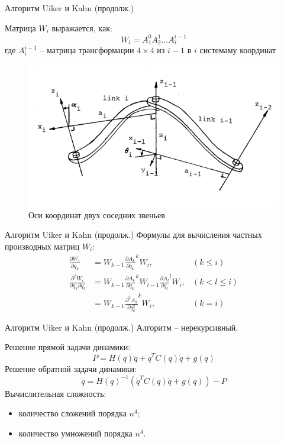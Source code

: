 \documentclass[newPxFont,numfooter,sectionpages]{beamer}
\begin{document}
\begin{frame}{Алгоритм Uiker и Kahn (продолж.)}
	
	Матрица $W_i$ выражается, как:
	\begin{equation*}
	W_i = A_1^0 A_2^1 ... A_i^{i-1}
	\end{equation*}
	где $A_i^{i-1}$ -- матрица трансформации $4 \times 4$ из $i-1$ в $i$ системаму координат
	
	\begin{figure}[H]
		\center\includegraphics[width=0.7\linewidth]{1.png}
		\caption{Оси координат двух соседних звеньев}
		\label{fig:scr1}
	\end{figure}
\end{frame}

\begin{frame}{Алгоритм Uiker и Kahn (продолж.)}
	Формулы для вычисления частных производных матриц $W_i$:
	\begin{align*}
	\frac{\partial W_i}{\partial q_k} &= W_{k-1} \frac{\partial A_k}{\partial q_k} ^k W_i, &(k \le i)\\
	\frac{\partial^2 W_i}{\partial q_k \partial q_l} 
	&= W_{k-1} \frac{\partial A_k}{\partial q_k} ^k W_{l-1}\frac{\partial A_l}{\partial q_l} ^l W_i, &(k < l \le i) \\
	&= W_{k-1} \frac{\partial^2 A_k}{\partial q_k^2} ^k W_i, &(k = i)
	\end{align*}
\end{frame}

\begin{frame}{Алгоритм Uiker и Kahn (продолж.)}
	Алгоритм -- нерекурсивный.
	
	Решение прямой задачи динамики:
	\begin{equation*}
		P = H(q) \ddot q + \dot q^T C(q) \dot q + g(q)
	\end{equation*}
	Решение обратной задачи динамики:
	\begin{equation*}
		\ddot q = H(q)^{-1}(\dot q^T C(q) \dot q + g(q)) - P
	\end{equation*}
	Вычислительная сложность:
	\begin{itemize}
		\item количество сложений порядка $n^4$;
		\item количество умножений порядка $n^4$.
	\end{itemize}
\end{frame}
\end{document}
